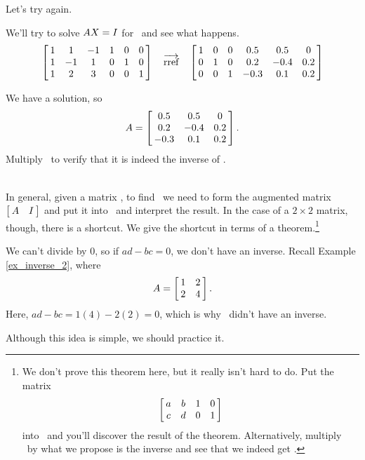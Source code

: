 Let's try again. \\

{We'll try to solve $\tta\ttx = \tti$ for \ttx\ and see what happens.
$$\bmx{cccccc}1&1&-1&1&0&0\\1&-1&1&0&1&0\\1&2&3&0&0&1\emx \quad \arref\quad \bmx{cccccc}1&0&0&0.5&0.5&0\\0&1&0&0.2&-0.4&0.2\\0&0&1&-0.3&0.1&0.2\emx$$

We have a solution, so $$\tta = \bmx{ccc}0.5&0.5&0\\0.2&-0.4&0.2\\-0.3&0.1&0.2\emx.$$ Multiply \tta\ttai\ to verify that it is indeed the inverse of \tta.}\\ %

In general, given a matrix \tta, to find \ttai\ we need to form the augmented matrix $\bmx{cc}\tta&\tti \emx$ and put it into \rref\ and interpret the result. In the case of a $2\times 2$ matrix, though, there is a shortcut. We give the shortcut in terms of a theorem.\footnote{We don't prove this theorem here, but it really isn't hard to do. Put the matrix $$\bmx{cccc}a&b&1&0\\c&d&0&1\emx$$ into \rref\ and you'll discover the result of the theorem. Alternatively, multiply \tta\ by what we propose is the inverse and see that we indeed get \tti.}


We can't divide by 0, so if $ad-bc=0$, we don't have an inverse. Recall Example \ref{ex_inverse_2}, where $$\tta = \bmx{cc}1&2\\2&4\emx.$$ Here, $ad-bc = 1(4) - 2(2) = 0$, which is why \tta\ didn't have an inverse.

Although this idea is simple, we should practice it.\\

